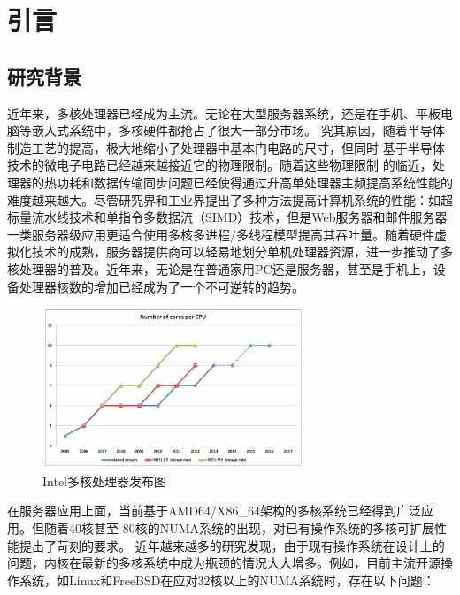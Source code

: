 

\chapter{引言}

\section{研究背景}

近年来，多核处理器已经成为主流。无论在大型服务器系统，还是在手机、平板电脑等嵌入式系统中，多核硬件都抢占了很大一部分市场。
究其原因，随着半导体制造工艺的提高，极大地缩小了处理器中基本门电路的尺寸，但同时
基于半导体技术的微电子电路已经越来越接近它的物理限制。随着这些物理限制
的临近，处理器的热功耗和数据传输同步问题已经使得通过升高单处理器主频提高系统性能的难度越来越大。尽管研究界和工业界提出了多种方法提高计算机系统的性能：如超标量流水线技术和单指令多数据流（SIMD）技术，但是Web服务器和邮件服务器一类服务器级应用更适合使用多核多进程/多线程模型提高其吞吐量。随着硬件虚拟化技术的成熟，服务器提供商可以轻易地划分单机处理器资源，进一步推动了多核处理器的普及。近年来，无论是在普通家用PC还是服务器，甚至是手机上，设备处理器核数的增加已经成为了一个不可逆转的趋势。

\begin{figure}[ht]
\begin{center}
\includegraphics[width=0.7\textwidth]{figures/intro_roadmap.png}
\end{center}
\caption{Intel多核处理器发布图\protect\footnotemark}
\label{fig:intro_roadmap}
\end{figure}
在服务器应用上面，当前基于AMD64/X86\_64架构的多核系统已经得到广泛应用。但随着40核甚至
80核的NUMA系统的出现，对已有操作系统的多核可扩展性能提出了苛刻的要求。
近年越来越多的研究发现\cite{radixvm:eurosys13}，由于现有操作系统在设计上的问题，内核在最新的多核系统中成为瓶颈的情况大大增多。例如，目前主流开源操作系统，如Linux和FreeBSD在应对32核以上的NUMA系统时，存在以下问题：

